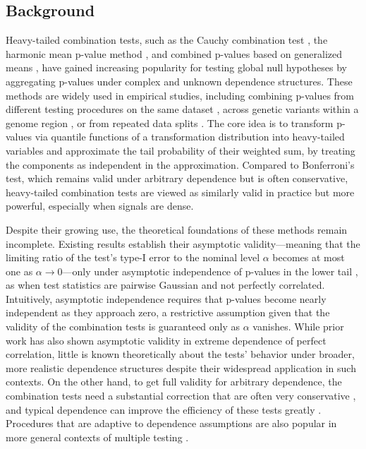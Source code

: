 \documentclass[12pt]{article}
\theoremstyle{plain}
\theoremstyle{plain}
\theoremstyle{definition}
\begin{document}
\subsection{Background}
Heavy-tailed combination tests, such as the Cauchy combination test \citep{liu2020cauchy}, the harmonic mean p-value method \citep{wilson2019harmonic}, and combined p-values  based on  generalized means \citep{vovk2020combining}, have gained increasing popularity for testing global null hypotheses by aggregating p-values under complex and unknown dependence structures. These methods are widely used in empirical studies, including combining p-values from different testing procedures on the same dataset \citep{sun2020statistical}, across genetic variants within a genome region \citep{liu2019acat}, or from repeated data splits \citep{cai2022model}. The core idea is to transform p-values via quantile functions of a transformation distribution into heavy-tailed variables and approximate the tail probability of their weighted sum, by treating the components as independent in the approximation. Compared to Bonferroni’s test, which remains valid under arbitrary dependence but is often conservative, heavy-tailed combination tests are viewed as similarly valid in practice but more powerful, especially when signals are dense. 

Despite their growing use, the theoretical foundations of these methods remain incomplete.  Existing results establish their asymptotic validity—meaning that the limiting ratio of the test’s type-I error to the nominal level $\alpha$ becomes at most one as $\alpha \to 0$---only under asymptotic independence of p-values in the lower tail \citep{liu2020cauchy,fang2023heavy,gui2023aggregating,liu2025heavily}, as when test statistics are pairwise Gaussian and not perfectly correlated. Intuitively, asymptotic independence requires that p-values become nearly independent as they approach zero, a restrictive assumption given that the validity of the combination tests is guaranteed only as $\alpha$ vanishes.
While prior work has also shown asymptotic validity in extreme dependence of perfect correlation, little is known theoretically about the tests’ behavior under broader, more realistic dependence structures despite their widespread application in such contexts. 
On the other hand, to get full validity for  arbitrary dependence, the combination tests need a substantial correction that are often very conservative \citep{vovk2020combining, vovk2022admissible}, and typical dependence can improve the efficiency of these tests greatly \citep{chen2023trade, gasparin2025combining}.
Procedures that are adaptive to dependence assumptions are also popular in more general contexts of multiple testing \citep{fithian2022conditional,marandon2024adaptive}. 
\end{document}
